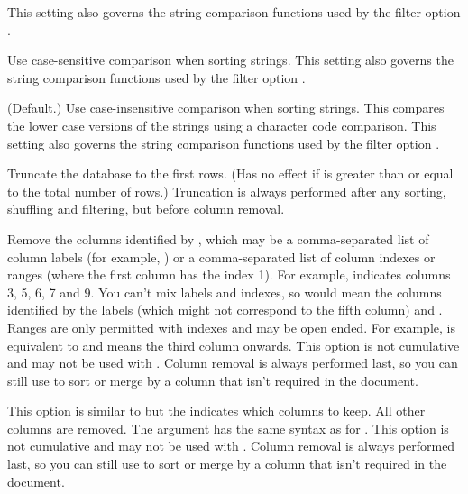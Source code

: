 This setting also governs the string comparison functions used by 
the filter option .

Use case-sensitive comparison when sorting strings.
This setting also governs the string comparison functions
used by the filter option .

(Default.) Use case-insensitive comparison when sorting strings.
This compares the lower case versions of the strings using a
character code comparison. This setting also governs the string
comparison functions used by the filter option .

Truncate the database to the first  rows.
(Has no effect if  is greater than or equal
to the total number of rows.) Truncation is always performed
after any sorting, shuffling and filtering, but before column 
removal.

Remove the columns identified by , which
may be a comma-separated list of column labels (for example, 
) or a comma-separated list of column indexes
or ranges (where the first column has the index 1). For example,
 indicates columns 3, 5, 6, 7 and 9. You can't mix
labels and indexes, so  would mean the
columns identified by the labels   (which
might not correspond to the fifth column) and .
Ranges are only permitted with indexes and may be open ended. For 
example,  is equivalent to  and  means
the third column onwards. This option is not cumulative and
may not be used with . Column removal
is always performed last, so you can still use  to sort or merge 
by a column that isn't required in the document.

This option is similar to  but the
 indicates which columns to keep. All other
columns are removed. The argument has the same syntax as for
. This option is not cumulative and 
may not be used with . Column removal
is always performed last, so you can still use  to sort or merge 
by a column that isn't required in the document.

